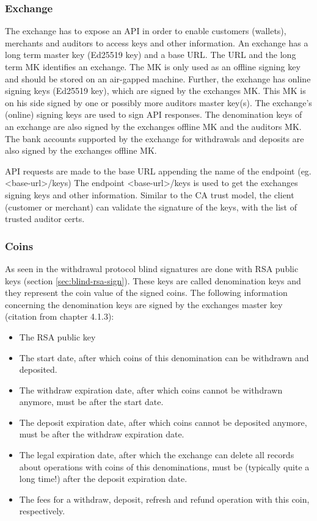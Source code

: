 \subsubsection{Exchange}
The exchange has to expose an API in order to enable customers (wallets), merchants and auditors to access keys and other information.
An exchange has a long term master key (Ed25519 key) and a base URL.
The URL and the long term \ac{MK} identifies an exchange.
The \ac{MK} is only used as an offline signing key and should be stored on an air-gapped machine.
Further, the exchange has online signing keys (Ed25519 key), which are signed by the exchanges \ac{MK}.
This \ac{MK} is on his side signed by one or possibly more auditors master key(s).
The exchange's (online) signing keys are used to sign API responses.
The denomination keys of an exchange are also signed by the exchanges offline \ac{MK} and the auditors \ac{MK}.
The bank accounts supported by the exchange for withdrawals and deposits are also signed by the exchanges offline \ac{MK}.

API requests are made to the base URL appending the name of the endpoint (eg. <base-url>/keys)
The endpoint <base-url>/keys is used to get the exchanges signing keys and other information.
Similar to the \ac{CA} trust model, the client (customer or merchant) can validate the signature of the keys, with the list of trusted auditor certs.

\subsubsection{Coins}
As seen in the withdrawal protocol blind signatures are done with RSA public keys (section \ref{sec:blind-rsa-sign}).
These keys are called denomination keys and they represent the coin value of the signed coins.
The following information concerning the denomination keys are signed by the exchanges master key (citation from \cite{dold:the-gnu-taler-system} chapter 4.1.3):
\begin{itemize}
    \item The RSA public key
    \item The start date, after which coins of this denomination can be withdrawn and deposited.
    \item The  withdraw  expiration  date,  after  which  coins  cannot  be  withdrawn anymore, must be after the start date.
    \item The deposit expiration date, after which coins cannot be deposited anymore, must be after the withdraw expiration date.
    \item The legal expiration date, after which the exchange can delete all records about operations with coins of this denominations, must be (typically quite a long time!) after the deposit expiration date.
    \item The fees for a withdraw, deposit, refresh and refund operation with this coin, respectively.
\end{itemize}

